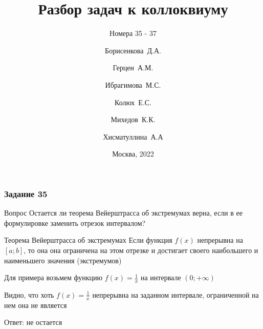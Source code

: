 \documentclass[8pt]{beamer}
\title[Коллоквиум]
{Разбор задач к коллоквиуму}
\subtitle{Номера 35 - 37}
\author[БИБ224]
{Борисенкова~Д.А. \and Герцен~А.М. \and Ибрагимова~М.С. \and Колюх~Е.С. \and Михедов~К.К. \and Хисматуллина~А.А}
\institute[НИУ ВШЭ]
{НИУ Высшая Школа Экономики}
\date{Москва, 2022}
\begin{document}
    
  \frame{\titlepage}

  \begin{frame}
    \frametitle{Задание 35}    

    \begin{block}{Вопрос}
      Остается ли теорема Вейерштрасса об экстремумах верна, если в ее формулировке заменить
      отрезок интервалом?
    \end{block} \pause

    \begin{alertblock}{Теорема Вейерштрасса об экстремумах}
      Если функция $f(x)$ непрерывна на $[a; b]$, то она она ограничена на этом отрезке
      и достигает своего наибольшего и наименьшего значения (экстремумов)
    \end{alertblock} \pause

    Для примера возьмем функцию $f(x) = \frac{1}{x}$ на интервале $(0; +\infty)$ \pause

    Видно, что хоть $f(x) = \frac{1}{x}$ непрерывна на заданном интервале, ограниченной на
    нем она не является \pause

    \begin{flushright}
        Ответ: не остается
    \end{flushright}
  \end{frame}
\end{document}
